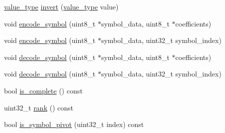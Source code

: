 \begin{DoxyCompactItemize}
\begin{DoxyCompactList}\small\item\em \end{DoxyCompactList}\item 
\hyperlink{classkodo_1_1proxy__layer_a1e9ff5aada4a2ab5dc0ce4e7df39160a}{value\-\_\-type} \hyperlink{classkodo_1_1proxy__layer_a3cacf8747632c617177eabc118d80f8d}{invert} (\hyperlink{classkodo_1_1proxy__layer_a1e9ff5aada4a2ab5dc0ce4e7df39160a}{value\-\_\-type} value)
\begin{DoxyCompactList}\small\item\em \end{DoxyCompactList}\item 
void \hyperlink{classkodo_1_1proxy__layer_ae5e31bc08644f79919d9c8bcf423f00b}{encode\-\_\-symbol} (uint8\-\_\-t $\ast$symbol\-\_\-data, uint8\-\_\-t $\ast$coefficients)
\begin{DoxyCompactList}\small\item\em \end{DoxyCompactList}\item 
void \hyperlink{classkodo_1_1proxy__layer_ac7db34a51007e1604006ec1cb0f22585}{encode\-\_\-symbol} (uint8\-\_\-t $\ast$symbol\-\_\-data, uint32\-\_\-t symbol\-\_\-index)
\begin{DoxyCompactList}\small\item\em \end{DoxyCompactList}\item 
void \hyperlink{classkodo_1_1proxy__layer_a7009282cb24089bf752fd37421dbca5e}{decode\-\_\-symbol} (uint8\-\_\-t $\ast$symbol\-\_\-data, uint8\-\_\-t $\ast$coefficients)
\begin{DoxyCompactList}\small\item\em \end{DoxyCompactList}\item 
void \hyperlink{classkodo_1_1proxy__layer_a8ac13dbbf59e298469e9318ab00bf048}{decode\-\_\-symbol} (uint8\-\_\-t $\ast$symbol\-\_\-data, uint32\-\_\-t symbol\-\_\-index)
\begin{DoxyCompactList}\small\item\em \end{DoxyCompactList}\item 
bool \hyperlink{classkodo_1_1proxy__layer_ad30a1215b020e4d98b7119142d49f2bb}{is\-\_\-complete} () const 
\begin{DoxyCompactList}\small\item\em \end{DoxyCompactList}\item 
uint32\-\_\-t \hyperlink{classkodo_1_1proxy__layer_ad47518fe7533335e8bf6add606e651c9}{rank} () const 
\begin{DoxyCompactList}\small\item\em \end{DoxyCompactList}\item 
bool \hyperlink{classkodo_1_1proxy__layer_a04434d65503a6df95ec49c4ab463ad55}{is\-\_\-symbol\-\_\-pivot} (uint32\-\_\-t index) const 
\begin{DoxyCompactList}\small\item\em \end{DoxyCompactList}\end{DoxyCompactItemize}
